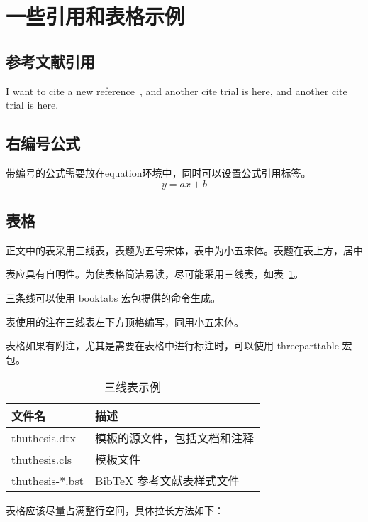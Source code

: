 \section{一些引用和表格示例}
\setcounter{table}{0}
\setcounter{equation}{0}
\subsection{参考文献引用}
I want to cite a new reference~, 
and another cite trial is here\cite{1993},
and another cite trial is here\citep{SVM003}.

\subsection{右编号公式}
带编号的公式需要放在equation环境中，同时可以设置公式引用标签。
\begin{equation}\label{3} 
    y = ax + b
  \end{equation}

\subsection{表格}
正文中的表采用三线表，表题为五号宋体，表中为小五宋体。表题在表上方，居中

表应具有自明性。为使表格简洁易读，尽可能采用三线表，如表~\ref{tab:three-line}。

三条线可以使用 {booktabs} 宏包提供的命令生成。

表使用的注在三线表左下方顶格编写，同用小五宋体。


表格如果有附注，尤其是需要在表格中进行标注时，可以使用 {threeparttable} 宏包。


\begin{table}[htbp]
  \centering
  \caption{三线表示例}
  \vspace{-0.8em}
  \begin{tabular}{ll}
    \toprule
    文件名          & 描述                         \\
    \midrule
    thuthesis.dtx   & 模板的源文件，包括文档和注释 \\
    thuthesis.cls   & 模板文件                     \\
    thuthesis-*.bst & BibTeX 参考文献表样式文件    \\
    \bottomrule
  \end{tabular}
  \label{tab:three-line}
\end{table}

  表格应该尽量占满整行空间，具体拉长方法如下：

